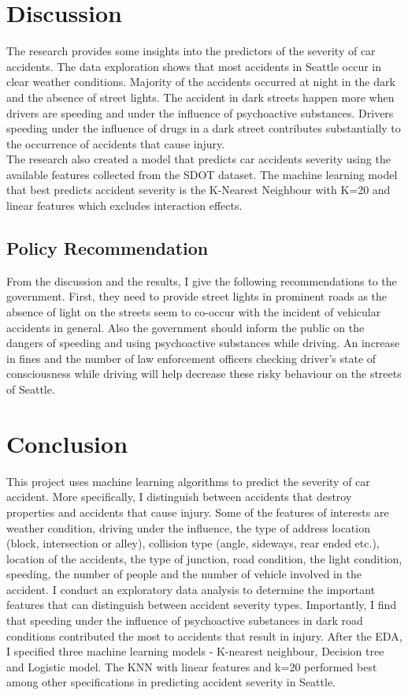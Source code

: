 \documentclass[a4paper,12pt]{article}
\begin{document}
\section{Discussion}
The research provides some insights into the predictors of the severity of car accidents. The data exploration shows that most accidents in Seattle occur in clear weather conditions. Majority of the accidents occurred at night in the dark and the absence of street lights. The accident in dark streets happen more when drivers are speeding and under the influence of psychoactive substances. Drivers speeding under the influence of drugs in a dark street contributes substantially to the occurrence of accidents that cause injury.\\

The research also created a model that predicts car accidents severity using the available features collected from the SDOT dataset. The machine learning model that best predicts accident severity is the K-Nearest Neighbour with K=20 and linear features which excludes interaction effects.

\subsection{Policy Recommendation}
From the discussion and the results, I give the following recommendations to the government. First, they need to provide street lights in prominent roads as the absence of light on the streets seem to co-occur with the incident of vehicular accidents in general. Also the government should inform the public on the dangers of speeding and using psychoactive substances while driving. An increase in fines and the number of law enforcement officers checking driver's state of consciousness while driving will help decrease these risky behaviour on the streets of Seattle.

\section{Conclusion}
This project uses machine learning algorithms to predict the severity of car accident. More specifically, I distinguish between accidents that destroy properties and accidents that cause injury. Some of the features of interests are weather condition, driving under the influence, the type of address location (block, intersection or alley), collision type (angle, sideways, rear ended etc.), location of the accidents, the type of junction, road condition, the light condition, speeding, the number of people and the number of vehicle involved in the accident. I conduct an exploratory data analysis to determine the important features that can distinguish between accident severity types. Importantly, I find that speeding under the influence of psychoactive substances in dark road conditions contributed the most to accidents that result in injury. After the EDA, I specified three machine learning models - K-nearest neighbour, Decision tree and Logistic model. The KNN with linear features and k=20 performed best among other specifications in predicting accident severity in Seattle.
\end{document}

